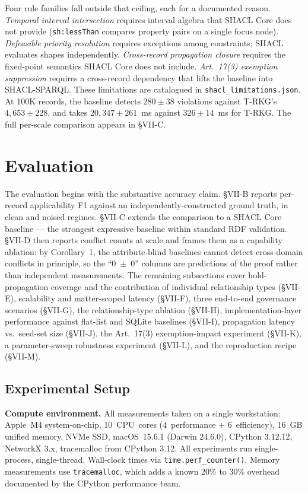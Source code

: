 \documentclass{ieeeaccess}
\begin{document}
Four rule families fall outside that ceiling, each for a documented reason. \emph{Temporal interval intersection} requires interval algebra that SHACL Core does not provide (\texttt{sh:lessThan} compares property pairs on a single focus node). \emph{Defeasible priority resolution} requires exceptions among constraints; SHACL evaluates shapes independently. \emph{Cross-record propagation closure} requires the fixed-point semantics SHACL Core does not include. \emph{Art.~17(3) exemption suppression} requires a cross-record dependency that lifts the baseline into SHACL-SPARQL. These limitations are catalogued in \texttt{shacl\_limitations.json}. At 100K records, the baseline detects $280 \pm 38$ violations against T-RKG's $4{,}653 \pm 228$, and takes $20{,}347 \pm 261$~ms against $326 \pm 14$~ms for T-RKG. The full per-scale comparison appears in §VII-C.

\section{Evaluation}
\label{sec:eval}

The evaluation begins with the substantive accuracy claim. §VII-B reports per-record applicability F1 against an independently-constructed ground truth, in clean and noised regimes. §VII-C extends the comparison to a SHACL Core baseline --- the strongest expressive baseline within standard RDF validation. §VII-D then reports conflict counts at scale and frames them as a capability ablation: by Corollary~1, the attribute-blind baselines cannot detect cross-domain conflicts in principle, so the ``0~$\pm$~0'' columns are predictions of the proof rather than independent measurements. The remaining subsections cover hold-propagation coverage and the contribution of individual relationship types (§VII-E), scalability and matter-scoped latency (§VII-F), three end-to-end governance scenarios (§VII-G), the relationship-type ablation (§VII-H), implementation-layer performance against flat-list and SQLite baselines (§VII-I), propagation latency vs.\ seed-set size (§VII-J), the Art.~17(3) exemption-impact experiment (§VII-K), a parameter-sweep robustness experiment (§VII-L), and the reproduction recipe (§VII-M).

\subsection{Experimental Setup}

\textbf{Compute environment.} All measurements taken on a single workstation: Apple~M4 system-on-chip, 10~CPU~cores (4~performance + 6~efficiency), 16~GB unified memory, NVMe SSD, macOS~15.6.1 (Darwin 24.6.0), CPython 3.12.12, NetworkX 3.x, tracemalloc from CPython 3.12. All experiments run single-process, single-thread. Wall-clock times via \texttt{time.perf\_counter()}. Memory measurements use \texttt{tracemalloc}, which adds a known 20\% to 30\% overhead documented by the CPython performance team.
\end{document}
